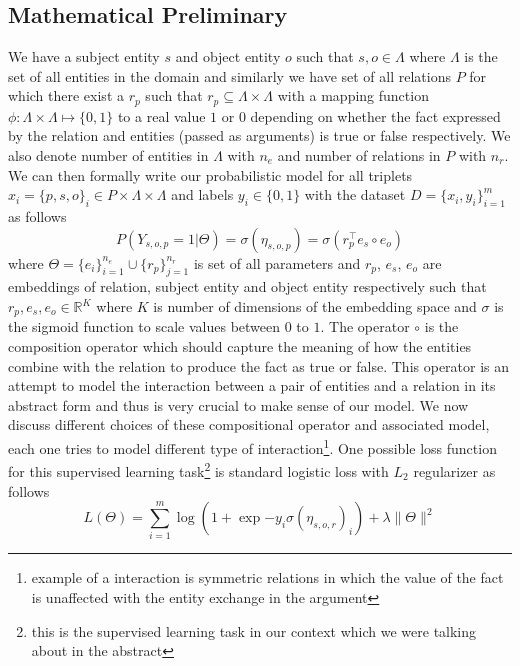 \documentclass[12pt]{article}
\begin{document}
\subsection{Mathematical Preliminary}
We have a subject entity $s$ and object entity $o$ such that $s, o \in \Lambda$ where $\Lambda$ is the set of all entities in the domain and similarly we have set of all relations $P$ for which there exist a $r_{p}$ such that $r_{p} \subseteq \Lambda \times \Lambda $ with a mapping function $\phi: \Lambda \times \Lambda \mapsto \{0, 1\}$ to a real value $1$ or $0$ depending on whether the fact expressed by the relation and entities (passed as arguments) is true or false respectively. We also denote number of entities in $\Lambda$ with $n_{e}$ and number of relations in $P$ with $n_{r}$. We can then formally write our probabilistic model for all triplets $x_{i} = \{p, s, o\}_{i} \in P \times \Lambda \times \Lambda$ and labels $y_{i} \in \{0, 1\}$ with the dataset $D=\{x_{i}, y_{i}\}_{i=1}^{m}$ as follows
\begin{equation}
P(Y_{s, o, p}=1 | \Theta) = \sigma(\eta_{s, o, p}) = \sigma(r_{p}^{\intercal}e_{s}\circ e_{o})
\end{equation} where $\Theta=\{e_{i}\}_{i=1}^{n_{e}}\cup \{r_{p}\}_{j=1}^{n_{r}}$ is set of all parameters and $r_{p}$, $e_{s}$, $e_{o}$ are embeddings of relation, subject entity and object entity respectively such that $r_{p}, e_{s}, e_{o} \in \mathbb{R}^{K}$ where $K$ is number of dimensions of the embedding space and $\sigma$ is the sigmoid function to scale values between $0$ to $1$. The operator $\circ$ is the composition operator which should capture the meaning of how the entities combine with the relation to produce the fact as true or false. This operator is an attempt to model the interaction between a pair of entities and a relation in its abstract form and thus is very crucial to make sense of our model. We now discuss different choices of these compositional operator and associated model, each one tries to model different type of interaction\footnote{example of a interaction is symmetric relations in which the value of the fact is unaffected with the entity exchange in the argument}. One possible loss function for this supervised learning task\footnote{this is the supervised learning task in our context which we were talking about in the abstract} is standard logistic loss with $L_{2}$ regularizer as follows
\begin{equation}
L(\Theta) = \sum_{i=1}^{m}\log(1+\exp{-y_{i}\sigma(\eta_{s, o, r})_{i}}) + \lambda\|\Theta\|^{2}
\end{equation}
\end{document}
